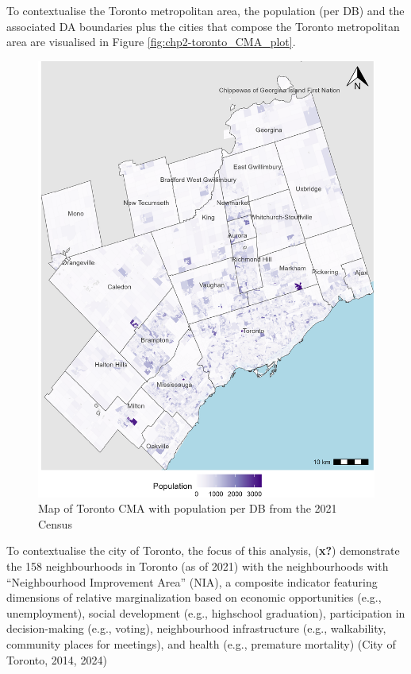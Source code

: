\documentclass[
11pt, %
oneside, %
english, %
singlespacing, %
]{macthesis} %
\begin{document}
To contextualise the Toronto metropolitan area, the population (per DB) and the associated DA boundaries plus the cities that compose the Toronto metropolitan area are visualised in Figure \ref{fig:chp2-toronto_CMA_plot}.

\begin{figure}

{\centering \includegraphics[width=6in]{./data/figures/chp2-toronto_CMA_plot} 

}

\caption{\label{fig:chp2-toronto_CMA_plot}Map of Toronto CMA with population per DB from the 2021 Census}\label{fig:unnamed-chunk-11}
\end{figure}

To contextualise the city of Toronto, the focus of this analysis, (\textbf{x?}) demonstrate the 158 neighbourhoods in Toronto (as of 2021) with the neighbourhoods with ``Neighbourhood Improvement Area'' (NIA), a composite indicator featuring dimensions of relative marginalization based on economic opportunities (e.g., unemployment), social development (e.g., highschool graduation), participation in decision-making (e.g., voting), neighbourhood infrastructure (e.g., walkability, community places for meetings), and health (e.g., premature mortality) (City of Toronto, 2014, 2024)
\end{document}
